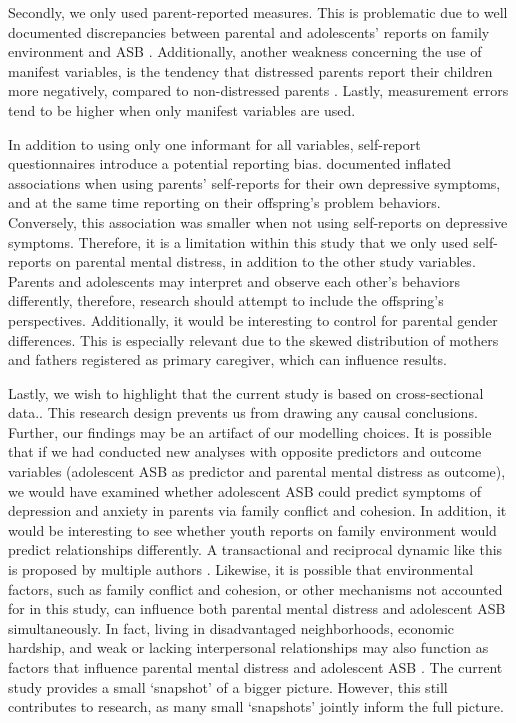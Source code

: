 \documentclass{sn-jnl}                  %
\begin{document}
Secondly, we only used parent-reported measures. This is problematic due to well documented discrepancies between parental and adolescents' reports on family environment and ASB \citep{delosreyes:2011, robinson:2019, petegem:2020}. Additionally, another weakness concerning the use of manifest variables, is the tendency that distressed parents report their children more negatively, compared to non-distressed parents \citep{korhonen:2014}. Lastly, measurement errors tend to be higher when only manifest variables are used.

In addition to using only one informant for all variables, self-report questionnaires introduce a potential reporting bias. \citet{ringoot:2015} documented inflated associations when using parents' self-reports for their own depressive symptoms, and at the same time reporting on their offspring's problem behaviors. Conversely, this association was smaller when not using self-reports on depressive symptoms. Therefore, it is a limitation within this study that we only used self-reports on parental mental distress, in addition to the other study variables. Parents and adolescents may interpret and observe each other's behaviors differently, therefore, research should attempt to  include the offspring's perspectives. Additionally, it would be interesting to control for parental gender differences. This is especially relevant due to the skewed distribution of mothers and fathers registered as primary caregiver, which can influence results.

Lastly, we wish to highlight that the current study is based on cross-sectional data.. This research design prevents us from drawing any causal conclusions. Further, our findings may be an artifact of our modelling choices. It is possible that if we had conducted new analyses with opposite predictors and outcome variables (adolescent ASB as predictor and parental mental distress as outcome), we would have examined whether adolescent ASB could predict symptoms of depression and anxiety in parents via family conflict and cohesion. In addition, it would be interesting to see whether youth reports on family environment would predict relationships differently. A transactional and reciprocal dynamic like this is proposed by multiple authors \citep{cummings:2000, nicholson:2011}. Likewise, it is possible that environmental factors, such as family conflict and cohesion, or other mechanisms not accounted for in this study, can influence both parental mental distress and adolescent ASB simultaneously. In fact, living in disadvantaged neighborhoods, economic hardship, and weak or lacking interpersonal relationships may also function as factors that influence parental mental distress and adolescent ASB \citep{joyner:2021, vreeland:2019}. The current study provides a small `snapshot' of a bigger picture. However, this still contributes to research, as many small `snapshots' jointly inform the full picture.
\end{document}
